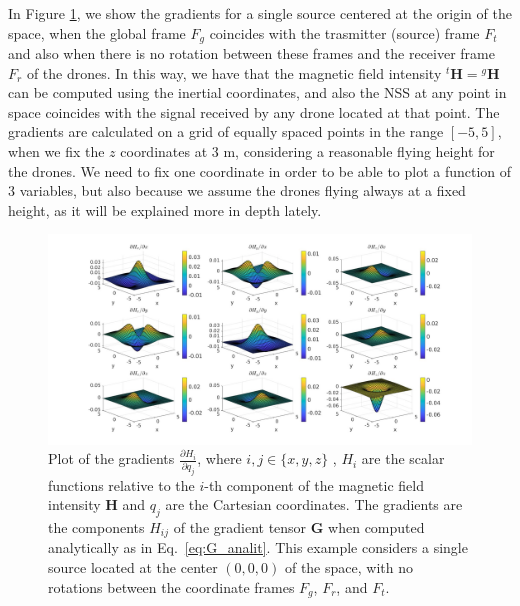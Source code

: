 In Figure \ref{fig:gradients_single_anal}, we show the gradients for a single
source centered at the origin of the space, when the global frame 
$F_g$ coincides with the trasmitter (source) frame $F_t$ and also when there 
is no rotation between these frames and the receiver frame $F_r$ of the drones. 
In this way, we have that the magnetic field intensity ${}^t \mathbf{H} = {}^g \mathbf{H}$
can be computed using the inertial coordinates, and also the
NSS at any point in space coincides with the signal received by 
any drone located at that point.
The gradients are calculated on a grid of equally spaced points in the range $[-5, 5]$, when we fix the $z$ coordinates
at 3 m, considering a reasonable flying height for the drones.
We need to fix one coordinate in order to be able to plot 
a function of 3 variables, but also because we assume the drones
flying always at a fixed height, as it will be explained more in 
depth lately.   
\begin{figure}[h]
\centering
\hspace*{-0.2\textwidth} 
\includegraphics[width=1.4\textwidth]{images/gradients_single_anal.jpg}
\caption{Plot of the gradients \( \frac{\partial H_i}{\partial q_j} \), where \( i, j \in \{x, y, z\} \)
, $H_i$ are the scalar functions relative to the $i$-th component of the magnetic field 
intensity $\mathbf{H}$ and $q_j$ are the Cartesian coordinates.
The gradients are the components $H_{ij}$ of the gradient tensor \( \mathbf{G} \) when computed analytically as in Eq.~\ref{eq:G_analit}. 
This example considers a single source located at the center \((0,0,0)\) of the space, with no rotations 
between the coordinate frames \( F_g \), \( F_r \), and \( F_t \).}
\label{fig:gradients_single_anal}
\end{figure}

